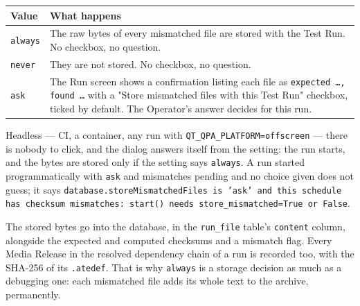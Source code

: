 \begin{center}
\footnotesize
\begin{tabular}{@{}>{\raggedright\arraybackslash}p{2.6cm}>{\raggedright\arraybackslash}p{12.2cm}@{}}
\toprule
Value & What happens \\
\midrule
\texttt{always} & The raw bytes of every mismatched file are stored with the Test Run. No
  checkbox, no question. \\
\texttt{never} & They are not stored. No checkbox, no question. \\
\texttt{ask} & The Run screen shows a confirmation listing each file as \texttt{expected \dots,
  found \dots} with a "Store mismatched files with this Test Run" checkbox, ticked by default. The
  Operator's answer decides for this run. \\
\bottomrule
\end{tabular}
\end{center}

Headless --- CI, a container, any run with \texttt{QT\_QPA\_PLATFORM=offscreen} --- there is nobody
to click, and the dialog answers itself from the setting: the run starts, and the bytes are stored
only if the setting says \texttt{always}. A run started programmatically with \texttt{ask} and
mismatches pending and no choice given does not guess; it says
\texttt{database.storeMismatchedFiles is 'ask' and this schedule has checksum mismatches: start()
needs store\_mismatched=True or False}.

The stored bytes go into the database, in the \texttt{run\_file} table's \texttt{content} column,
alongside the expected and computed checksums and a mismatch flag. Every Media Release in the
resolved dependency chain of a run is recorded too, with the SHA-256 of its \texttt{.atedef}. That
is why \texttt{always} is a storage decision as much as a debugging one: each mismatched file adds
its whole text to the archive, permanently.

